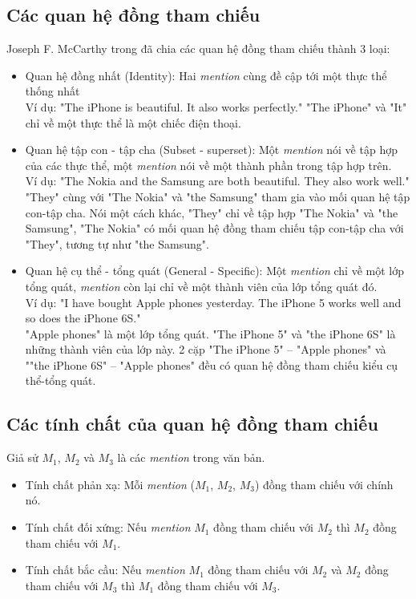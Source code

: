 \documentclass[12pt]{report}
\begin{document}
			\subsection*{Các quan hệ đồng tham chiếu}		
				Joseph F. McCarthy trong \cite{corefdef} đã chia các quan hệ đồng tham chiếu thành 3 loại: 
				\begin{itemize}
					\item{Quan hệ đồng nhất (Identity): Hai \textit{mention} cùng đề cập tới một thực thể thống nhất\\
					Ví dụ: "The iPhone is beautiful. It also works perfectly."
					"The iPhone" và "It" chỉ về một thực thể là một chiếc điện thoại.}
					\item{Quan hệ tập con - tập cha (Subset - superset): Một \textit{mention} nói về tập hợp của các thực thể, một \textit{mention} nói về một thành phần trong tập hợp trên.\\
					Ví dụ: "The Nokia and the Samsung are both beautiful. They also work well."\\
					"They" cùng với "The Nokia" và "the Samsung" tham gia vào mối quan hệ tập con-tập cha. Nói một cách khác, "They" chỉ về tập hợp "The Nokia" và "the Samsung", "The Nokia" có mối quan hệ đồng tham chiếu tập con-tập cha với "They", tương tự như "the Samsung".}
					\item{Quan hệ cụ thể - tổng quát (General - Specific): Một \textit{mention} chỉ về một lớp tổng quát, \textit{mention} còn lại chỉ về một thành viên của lớp tổng quát đó.\\
					Ví dụ: "I have bought Apple phones yesterday. The iPhone 5 works well and so does the iPhone 6S."\\
					"Apple phones" là một lớp tổng quát. "The iPhone 5" và "the iPhone 6S" là những thành viên của lớp này. 2 cặp "The iPhone 5" – "Apple phones" và ""the iPhone 6S" – "Apple phones" đều có quan hệ đồng tham chiếu kiểu cụ thể-tổng quát.}
				\end{itemize}
			\subsection*{Các tính chất của quan hệ đồng tham chiếu}
			Giả sử $M_1$, $M_2$ và $M_3$ là các \textit{mention} trong văn bản.
			\begin{itemize}
				\item{Tính chất phản xạ: Mỗi \textit{mention} ($M_1$, $M_2$, $M_3$) đồng tham chiếu với chính nó.}
				\item{Tính chất đối xứng: Nếu \textit{mention} $M_1$ đồng tham chiếu với $M_2$ thì $M_2$ đồng tham chiếu với $M_1$.}
				\item{Tính chất bắc cầu: Nếu \textit{mention} $M_1$ đồng tham chiếu với $M_2$ và $M_2$ đồng tham chiếu với $M_3$ thì $M_1$ đồng tham chiếu với $M_3$.}
			\end{itemize}
\end{document}
